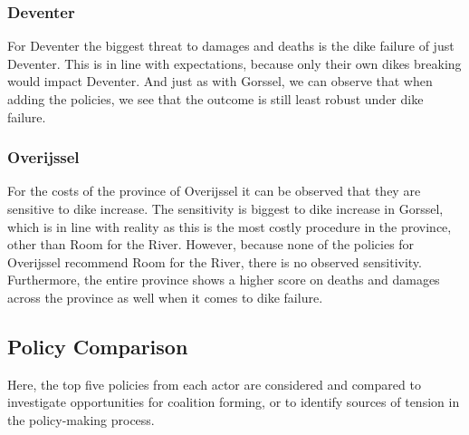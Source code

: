 \subsubsection{Deventer}

For Deventer the biggest threat to damages and deaths is the dike failure of just Deventer. This is in line with expectations, because only their own dikes breaking would impact Deventer. And just as with Gorssel, we can observe that when adding the policies, we see that the outcome is still least robust under dike failure. 

\subsubsection{Overijssel}

For the costs of the province of Overijssel it can be observed that they are sensitive to dike increase. The sensitivity is biggest to dike increase in Gorssel, which is in line with reality as this is the most costly procedure in the province, other than Room for the River. However, because none of the policies for Overijssel recommend Room for the River, there is no observed sensitivity. Furthermore, the entire province shows a higher score on deaths and damages across the province as well when it comes to dike failure. 

\subsection{Policy Comparison}
Here, the top five policies from each actor are considered and compared to investigate opportunities for coalition forming, or to identify sources of tension in the policy-making process.